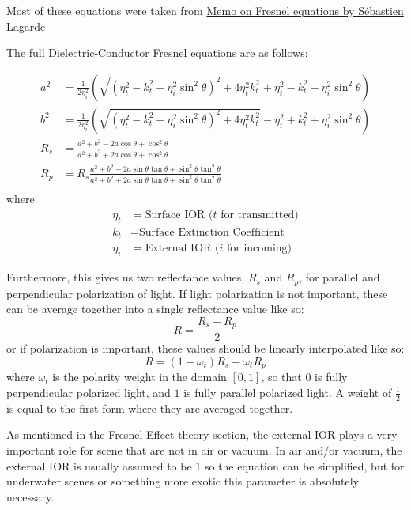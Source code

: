 \documentclass[12pt,letterpaper]{article}
\begin{document}
\noindent Most of these equations were taken from 
{\color{blue}\href{https://seblagarde.wordpress.com/2013/04/29/memo-on-fresnel-equations/}{Memo on Fresnel equations by Sébastien Lagarde}}

The full Dielectric-Conductor Fresnel equations are as follows:

\begin{align*}
    a^2 &= \frac{1}{2\eta_i^2}\left(\sqrt{{\left(\eta_t^2 - k_t^2 - \eta_i^2 \sin^2\theta\right)}^2 + 4\eta_t^2 k_t^2} + \eta_t^2 - k_t^2 - \eta_i^2 \sin^2\theta\right)\\
    b^2 &= \frac{1}{2\eta_i^2}\left(\sqrt{{\left(\eta_t^2 - k_t^2 - \eta_i^2 \sin^2\theta\right)}^2 + 4\eta_t^2 k_t^2} - \eta_t^2 + k_t^2 + \eta_i^2 \sin^2\theta\right)\\
    R_s &= \frac{a^2 + b^2 - 2a \cos\theta + \cos^2\theta }{a^2 + b^2 + 2a \cos\theta + \cos^2\theta}\\
    R_p &= R_s \frac{a^2 + b^2 - 2a \sin\theta \tan\theta + \sin^2\theta \tan^2\theta}{a^2+b^2+2 a\sin\theta \tan\theta + \sin^2\theta \tan^2\theta}\\
\end{align*}
where
\begin{align*}
    \eta_t &= \text{Surface IOR ($t$ for transmitted)}\\
    k_t    &= \text{Surface Extinction Coefficient}\\
    \eta_i &= \text{External IOR ($i$ for incoming)}
\end{align*}

Furthermore, this gives us two reflectance values, $R_s$ and $R_p$, for parallel and perpendicular polarization of light.
If light polarization is not important, these can be average together into a single reflectance value like so:
$$
R = \frac{R_s + R_p}{2}
$$
or if polarization is important, these values should be linearly interpolated like so:
$$
R = \left(1 - \omega_t\right) R_s + \omega_t R_p
$$
where $\omega_t$ is the polarity weight in the domain $\left[0,1\right]$, so that $0$ is fully perpendicular polarized light, 
and $1$ is fully parallel polarized light. A weight of $\frac{1}{2}$ is equal to the first form 
where they are averaged together.

As mentioned in the Fresnel Effect theory section, the external IOR plays a very important role for scene that are not in air or vacuum. In air and/or vacuum, 
the external IOR is usually assumed to be 1 so the equation can be simplified, but for underwater scenes or something more exotic this parameter is absolutely necessary.
\end{document}
